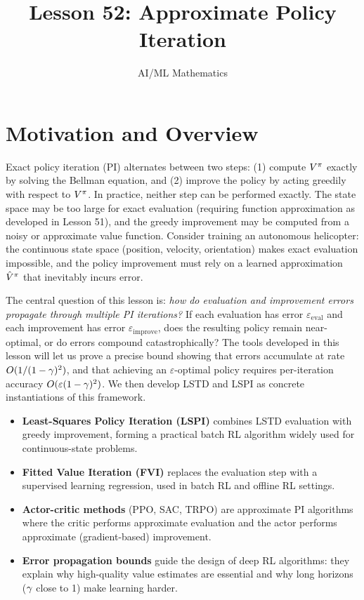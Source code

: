 \documentclass[11pt,a4paper]{article}
\title{Lesson 52: Approximate Policy Iteration}
\author{AI/ML Mathematics}
\date{}
\begin{document}
\maketitle
\tableofcontents
\newpage

\section{Motivation and Overview}
\label{sec:motivation}

Exact policy iteration (PI) alternates between two steps: (1) compute
$V^\pi$ exactly by solving the Bellman equation, and (2) improve
the policy by acting greedily with respect to $V^\pi$. In practice,
neither step can be performed exactly. The state space may be too large
for exact evaluation (requiring function approximation as developed in
Lesson 51), and the greedy improvement may be computed from a noisy or
approximate value function. Consider training an autonomous helicopter:
the continuous state space (position, velocity, orientation) makes exact
evaluation impossible, and the policy improvement must rely on a learned
approximation $\hat{V}^\pi$ that inevitably incurs error.

The central question of this lesson is: \emph{how do evaluation and
improvement errors propagate through multiple PI iterations?} If each
evaluation has error $\varepsilon_{\mathrm{eval}}$ and each improvement
has error $\varepsilon_{\mathrm{improve}}$, does the resulting policy
remain near-optimal, or do errors compound catastrophically? The tools
developed in this lesson will let us prove a precise bound showing that
errors accumulate at rate $O(1/(1-\gamma)^2)$, and that achieving
an $\varepsilon$-optimal policy requires per-iteration accuracy
$O(\varepsilon(1-\gamma)^2)$. We then develop LSTD and LSPI as
concrete instantiations of this framework.

\begin{rlconnection}[title={Where Approximate PI Appears}]
\begin{itemize}[nosep]
  \item \textbf{Least-Squares Policy Iteration (LSPI)} combines LSTD
    evaluation with greedy improvement, forming a practical batch RL
    algorithm widely used for continuous-state problems.
  \item \textbf{Fitted Value Iteration (FVI)} replaces the evaluation
    step with a supervised learning regression, used in batch RL and
    offline RL settings.
  \item \textbf{Actor-critic methods} (PPO, SAC, TRPO) are approximate
    PI algorithms where the critic performs approximate evaluation and
    the actor performs approximate (gradient-based) improvement.
  \item \textbf{Error propagation bounds} guide the design of deep RL
    algorithms: they explain why high-quality value estimates are
    essential and why long horizons ($\gamma$ close to 1) make
    learning harder.
\end{itemize}
\end{rlconnection}
\end{document}
